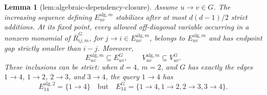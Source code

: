 \documentclass{article}
\newtheorem{lemma}{Lemma}
\begin{document}
\begin{lemma}[lem:algebraic-dependency-closure]\label{lem:algebraic-dependency-closure}
Assume \(u\to v\in G\).  The increasing sequence defining \(E_{uv}^{\mathrm{alg},m}\) stabilizes after at most \(d(d-1)/2\) strict additions.  At its fixed point, every allowed off-diagonal variable occurring in a nonzero monomial of \(\overline R^{G}_{ij,m}\), for \(j\to i\in E_{uv}^{\mathrm{alg},m}\), belongs to \(E_{uv}^{\mathrm{alg},m}\) and has endpoint gap strictly smaller than \(i-j\).  Moreover,
\[
 E_{uv}^{\mathrm{alg},m}\subseteq E_{uv}^{G},
 \qquad
 V_{uv}^{\mathrm{alg},m}\subseteq V_{uv}^{G}.
\]
These inclusions can be strict: when \(d=4\), \(m=2\), and \(G\) has exactly the edges \(1\to4\), \(1\to2\), \(2\to3\), and \(3\to4\), the query \(1\to4\) has
\[
 E_{14}^{\mathrm{alg},2}=\{1\to4\}
 \quad\text{but}\quad
 E_{14}^{G}=\{1\to4,1\to2,2\to3,3\to4\}.
\]
\end{lemma}
\end{document}
